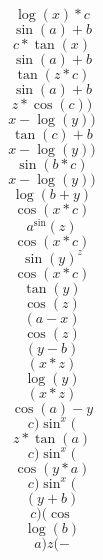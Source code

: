 \documentclass[12pt]{article}
\begin{document}
\Large
$$\log (x)*c$$
$$\sin (a)+b$$
$$c*\tan (x)$$
$$\sin (a)+b$$
$$\tan (z*c)$$
$$\sin (a)+b$$
$$z*\cos (c))$$
$$x-\log (y))$$
$$\tan (c)+b$$
$$x-\log (y))$$
$$\sin (b*c)$$
$$x-\log (y))$$
$$\log (b+y)$$
$$\cos (x*c)$$
$$a^\sin (z)$$
$$\cos (x*c)$$
$$\sin (y)^z$$
$$\cos (x*c)$$
$$\tan (y)$$
$$\cos (z)$$
$$(a-x)$$
$$\cos (z)$$
$$(y-b)$$
$$(x*z)$$
$$\log (y)$$
$$(x*z)$$
$$\cos (a)-y$$
$$c)\sin ^x($$
$$z*\tan (a)$$
$$c)\sin ^x($$
$$\cos (y*a)$$
$$c)\sin ^x($$
$$(y+b)$$
$$c)(\cos $$
$$\log (b)$$
$$a)z(-$$
\end{document}
